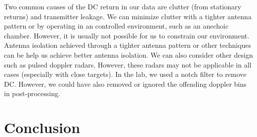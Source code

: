 \documentclass{article}
\begin{document}
Two common causes of the DC return in our data are clutter (from stationary returns) and transmitter leakage. We can minimize clutter with a tighter antenna pattern or by operating in an controlled environment, such as an anechoic chamber. However, it is usually not possible for us to constrain our environment. Antenna isolation achieved through a tighter antenna pattern or other techniques can be help us achieve better antenna isolation. We can also consider other design such as pulsed doppler radars. However, these radars may not be applicable in all cases (especially with close targets). In the lab, we used a notch filter to remove DC. However, we could have also removed or ignored the offending doppler bins in post-processing.

\section{Conclusion}


{}
\end{document}
